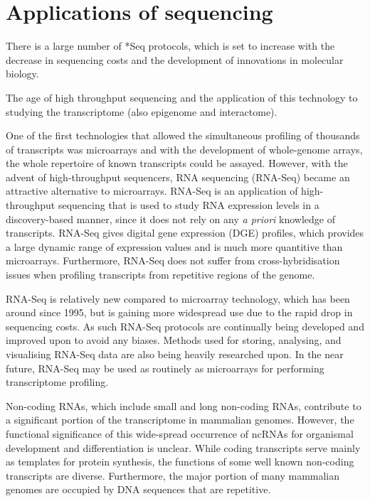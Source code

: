 \section{Applications of sequencing}

There is a large number of *Seq protocols\cite{pachter2014seq}, which is set to increase with the decrease in sequencing costs and the development of innovations in molecular biology.

The age of high throughput sequencing and the application of this technology to studying the transcriptome (also epigenome and interactome).

One of the first technologies that allowed the simultaneous profiling of thousands of transcripts was microarrays and with the development of whole-genome arrays, the whole repertoire of known transcripts could be assayed. However, with the advent of high-throughput sequencers, RNA sequencing (RNA-Seq) became an attractive alternative to microarrays. RNA-Seq is an application of high-throughput sequencing that is used to study RNA expression levels in a discovery-based manner, since it does not rely on any \textit{a priori} knowledge of transcripts. RNA-Seq gives digital gene expression (DGE) profiles, which provides a large dynamic range of expression values and is much more quantitive than microarrays. Furthermore, RNA-Seq does not suffer from cross-hybridisation issues when profiling transcripts from repetitive regions of the genome.

RNA-Seq is relatively new compared to microarray technology, which has been around since 1995, but is gaining more widespread use due to the rapid drop in sequencing costs. As such RNA-Seq protocols are continually being developed and improved upon to avoid any biases. Methods used for storing, analysing, and visualising RNA-Seq data are also being heavily researched upon. In the near future, RNA-Seq may be used as routinely as microarrays for performing transcriptome profiling.

Non-coding RNAs, which include small and long non-coding RNAs, contribute to a significant portion of the transcriptome in mammalian genomes. However, the functional significance of this wide-spread occurrence of ncRNAs for organismal development and differentiation is unclear. While coding transcripts serve mainly as templates for protein synthesis, the functions of some well known non-coding transcripts are diverse. Furthermore, the major portion of many mammalian genomes are occupied by DNA sequences that are repetitive.

